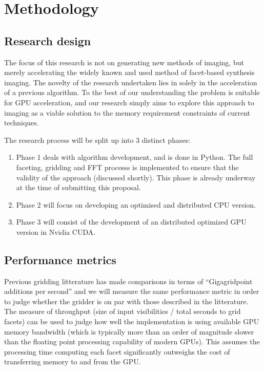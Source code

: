 \documentclass[a4paper, two column]{article}
\begin{document}
\section{Methodology}
\subsection{Research design}
The focus of this research is not on generating new methods of imaging, but merely accelerating the widely known and used method of facet-based synthesis imaging. The novelty of the research undertaken lies in solely in the acceleration
of a previous algorithm. To the best of our understanding the problem is suitable for GPU acceleration, and our research simply aims to explore this approach to imaging as a viable solution to the memory requirement constraints of current techniques.

The research process will be split up into 3 distinct phases:
\begin{enumerate}
 \item Phase 1 deals with algorithm development, and is done in Python. The full faceting, gridding and FFT processs is implemented to ensure that the validity of the approach (discussed shortly). This phase is already underway at the time of
       submitting this proposal.
 \item Phase 2 will focus on developing an optimised and distributed CPU version.
 \item Phase 3 will consist of the development of an distributed optimized GPU version in Nvidia CUDA.
\end{enumerate}

\subsection{Performance metrics}
Previous gridding litterature \cite{muscat2014high,romein2012efficient} has made comparisons in terms of ``Gigagridpoint additions per second'' and we will measure the same performance metric in order to judge whether the gridder is on par with those described 
in the litterature. The measure of throughput (size of input visibilities / total seconds to grid facets) can be used to judge how well the implementation is using available GPU memory bandwidth (which is typically more than an order of magnitude slower than the 
floating point processing capability of modern GPUs). This assumes the processing time computing each facet significantly outweighs the cost of transferring memory to and from the GPU.
\end{document}
